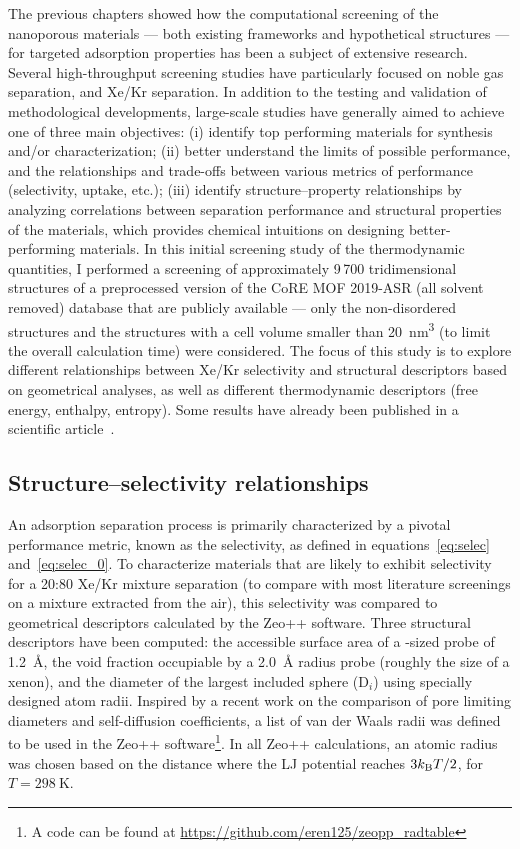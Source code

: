 \documentclass[main.tex]{subfiles}
\begin{document}
The previous chapters showed how the computational screening of the nanoporous materials --- both existing frameworks and hypothetical structures --- for targeted adsorption properties has been a subject of extensive research. Several high-throughput screening studies have particularly focused on noble gas separation, and Xe/Kr separation. In addition to the testing and validation of methodological developments, large-scale studies have generally aimed to achieve one of three main objectives: (i) identify top performing materials for synthesis and/or characterization; (ii) better understand the limits of possible performance, and the relationships and trade-offs between various metrics of performance (selectivity, uptake, etc.); (iii) identify structure--property relationships by analyzing correlations between separation performance and structural properties of the materials, which provides chemical intuitions on designing better-performing materials. In this initial screening study of the thermodynamic quantities, I performed a screening of approximately 9\,700 tridimensional structures of a preprocessed version of the CoRE MOF 2019-ASR (all solvent removed) database that are publicly available --- only the non-disordered structures and the structures with a cell volume smaller than \SI{20}{\nano\meter\cubed} (to limit the overall calculation time) were considered. The focus of this study is to explore different relationships between Xe/Kr selectivity and structural descriptors based on geometrical analyses, as well as different thermodynamic descriptors (free energy, enthalpy, entropy). Some results have already been published in a scientific article~\cite{Ren_2021}.

\subsection{Structure--selectivity relationships}\label{sct:geometry}

An adsorption separation process is primarily characterized by a pivotal performance metric, known as the selectivity, as defined in equations~\ref{eq:selec} and~\ref{eq:selec_0}. To characterize materials that are likely to exhibit selectivity for a 20:80 Xe/Kr mixture separation (to compare with most literature screenings on a mixture extracted from the air), this selectivity was compared to geometrical descriptors calculated by the Zeo++ software\autocite{Zeo++}. Three structural descriptors have been computed: the accessible surface area of a -sized probe of \SI{1.2}{\angstrom}, the void fraction occupiable by a \SI{2.0}{\angstrom} radius probe (roughly the size of a xenon),\autocite{vol_Ongari2017} and the diameter of the largest included sphere (D$_i$) using specially designed atom radii. Inspired by a recent work on the comparison of pore limiting diameters and self-diffusion coefficients,\autocite{Hung_2021} a list of van der Waals radii was defined to be used in the Zeo++ software\footnote[1]{A code can be found at \url{https://github.com/eren125/zeopp_radtable}}. In all Zeo++ calculations, an atomic radius was chosen based on the distance where the LJ potential reaches $3 k_{\text{B}} T/2$, for $T = \SI{298}{\kelvin}$.
\end{document}
